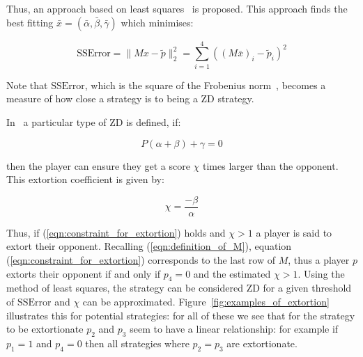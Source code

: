 \documentclass[a4paper]{article}
\begin{document}
Thus, an approach based on least squares~\cite{Golub2013} is proposed. This
approach finds the best fitting \(\bar x=(\bar\alpha, \bar\beta,
\bar\gamma)\) which minimises:

\begin{equation}\label{eqn:r_squared}
    \text{SSError} = \|M x-\tilde p\|_2^2 = \sum_{i=1}^{4}\left((M\bar x)_i-\tilde p_i\right)^2
\end{equation}

Note that \(\text{SSError}\), which is the square of the Frobenius
norm~\cite{Golub2013}, becomes a measure of how close a strategy is to being a ZD
strategy.

In~\cite{Press2012} a particular type of ZD is defined, if:

\begin{equation}\label{eqn:constraint_for_extortion}
    P(\alpha + \beta)+\gamma=0
\end{equation}

then the player can ensure they get a score \(\chi\) times
larger than the opponent. This extortion coefficient is given by:

\begin{equation}\label{eqn:definition_of_chi}
    \chi=\frac{-\beta}{\alpha}
\end{equation}

Thus, if (\ref{eqn:constraint_for_extortion}) holds and \(\chi >1\) a player is
said to extort their opponent. Recalling (\ref{eqn:definition_of_M}), equation
(\ref{eqn:constraint_for_extortion}) corresponds to the last row of \(M\), thus
a player \(p\) extorts their opponent if and only if \(p_4=0\) and the estimated
\(\chi > 1\). Using the method of least squares, the strategy can be
considered ZD for a given threshold of \(\text{SSError}\) and \(\chi\) can be
approximated. Figure~\ref{fig:examples_of_extortion} illustrates this for
potential strategies: for all of these we see that for the strategy to be
extortionate \(p_2\) and \(p_3\) seem to have a linear relationship: for example
if \(p_1=1\) and \(p_4=0\) then all strategies where \(p_2=p_3\) are
extortionate.
\end{document}
